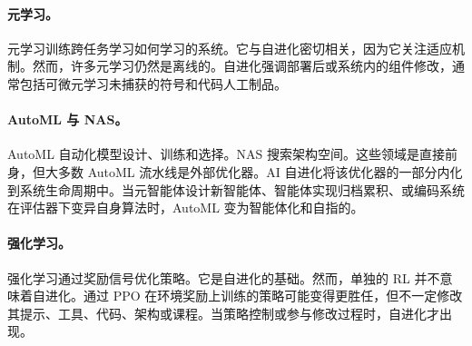 \paragraph{元学习。} 元学习训练跨任务学习如何学习的系统。它与自进化密切相关，因为它关注适应机制。然而，许多元学习仍然是离线的。自进化强调部署后或系统内的组件修改，通常包括可微元学习未捕获的符号和代码人工制品。

\paragraph{AutoML 与 NAS。} AutoML 自动化模型设计、训练和选择。NAS 搜索架构空间。这些领域是直接前身，但大多数 AutoML 流水线是外部优化器。AI 自进化将该优化器的一部分内化到系统生命周期中。当元智能体设计新智能体、智能体实现归档累积、或编码系统在评估器下变异自身算法时，AutoML 变为智能体化和自指的。

\paragraph{强化学习。} 强化学习通过奖励信号优化策略。它是自进化的基础。然而，单独的 RL 并不意味着自进化。通过 PPO 在环境奖励上训练的策略可能变得更胜任，但不一定修改其提示、工具、代码、架构或课程。当策略控制或参与修改过程时，自进化才出现。

\begin{table}[htbp]
\centering
{}
\caption{AI 自进化与邻近概念的关系。边界是多孔的：许多现代系统组合了多行概念，但自进化特别要求反馈驱动的系统自身操作组件修改。}
\label{tab:related-concepts}
\end{table}

